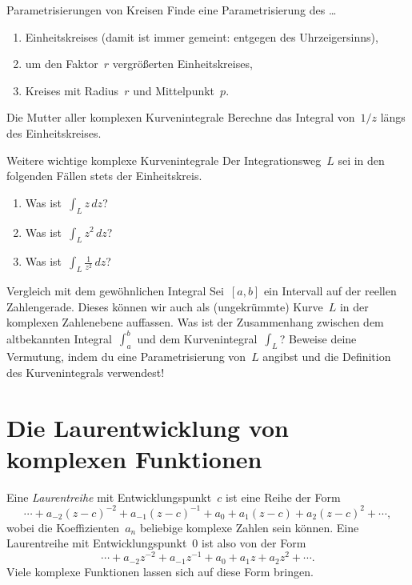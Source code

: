 \documentclass[twoside]{../zirkelblatt1415}
\theoremstyle{definition}
\theoremstyle{plain}
\theoremstyle{remark}
\begin{document}
\begin{aufgabe}{Parametrisierungen von Kreisen}
Finde eine Parametrisierung des \ldots
\begin{enumerate}
\item Einheitskreises (damit ist immer gemeint: entgegen des Uhrzeigersinns),
\item um den Faktor~$r$ vergrößerten Einheitskreises,
\item Kreises mit Radius~$r$ und Mittelpunkt~$p$.
\end{enumerate}
\fixlistspacing
\end{aufgabe}

\begin{aufgabe}{Die Mutter aller komplexen Kurvenintegrale}
Berechne das Integral von~$1/z$ längs des Einheitskreises.
\end{aufgabe}

\begin{aufgabe}{Weitere wichtige komplexe Kurvenintegrale}
Der Integrationsweg~$L$ sei in den folgenden Fällen stets der Einheitskreis.
\begin{enumerate}
\item Was ist~$\int_L z \,dz$?
\item Was ist~$\int_L z^2 \,dz$?
\item Was ist~$\int_L \frac{1}{z^2} \,dz$?
\end{enumerate}
\end{aufgabe}

\begin{aufgabe}{Vergleich mit dem gewöhnlichen Integral}
Sei~$[a,b]$ ein Intervall auf der reellen Zahlengerade. Dieses können wir auch
als (ungekrümmte) Kurve~$L$ in der komplexen Zahlenebene auffassen. Was ist der
Zusammenhang zwischen dem altbekannten Integral~$\int_a^b$ und dem
Kurvenintegral~$\int_L$? Beweise deine Vermutung, indem du eine
Parametrisierung von~$L$ angibst und die Definition des Kurvenintegrals
verwendest!
\end{aufgabe}


\section{Die Laurentwicklung von komplexen Funktionen}

Eine \emph{Laurentreihe} mit Entwicklungspunkt~$c$ ist eine Reihe der Form
\[ \cdots + a_{-2} (z-c)^{-2} + a_{-1} (z-c)^{-1} + a_0 + a_1 (z-c) + a_2 (z-c)^2 + \cdots, \]
wobei die Koeffizienten~$a_n$ beliebige komplexe Zahlen sein können. Eine
Laurentreihe mit Entwicklungspunkt~$0$ ist also von der Form
\[ \cdots + a_{-2} z^{-2} + a_{-1} z^{-1} + a_0 + a_1 z + a_2 z^2 + \cdots. \]
Viele komplexe Funktionen lassen sich auf diese Form bringen.
\end{document}
